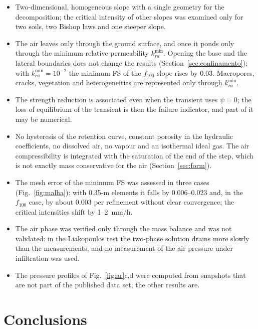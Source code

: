 \documentclass[preprint,12pt,authoryear]{elsarticle}
\begin{document}
\begin{itemize}
\item Two-dimensional, homogeneous slope with a single geometry for the decomposition; the critical intensity of
other slopes was examined only for two soils, two Bishop laws and one steeper slope.
\item The air leaves only through the ground surface, and once it ponds only through the minimum relative
permeability $k_{ra}^{\min}$. Opening the base and the lateral boundaries does not change the results
(Section~\ref{sec:confinamento}); with $k_{ra}^{\min}=10^{-2}$ the minimum FS of the $f_{100}$ slope rises by 0.03.
Macropores, cracks, vegetation and heterogeneities are represented only through $k_{ra}^{\min}$.
\item The strength reduction is associated even when the transient uses $\psi=0$; the loss of equilibrium of the
transient is then the failure indicator, and part of it may be numerical.
\item No hysteresis of the retention curve, constant porosity in the hydraulic coefficients, no dissolved air, no
vapour and an isothermal ideal gas. The air compressibility is integrated with the saturation of the end of the step,
which is not exactly mass conservative for the air (Section~\ref{sec:form}).
\item The mesh error of the minimum FS was assessed in three cases (Fig.~\ref{fig:malha}): with 0.35-m elements it
falls by 0.006--0.023 and, in the $f_{100}$ case, by about 0.003 per refinement without clear convergence; the
critical intensities shift by 1--2~mm/h.
\item The air phase was verified only through the mass balance and was not validated: in the Liakopoulos test the
two-phase solution drains more slowly than the measurements, and no measurement of the air pressure under
infiltration was used.
\item The pressure profiles of Fig.~\ref{fig:ar}c,d were computed from snapshots that are not part of the published
data set; the other results are.
\end{itemize}

\section{Conclusions}\label{sec:concl}


\end{document}
